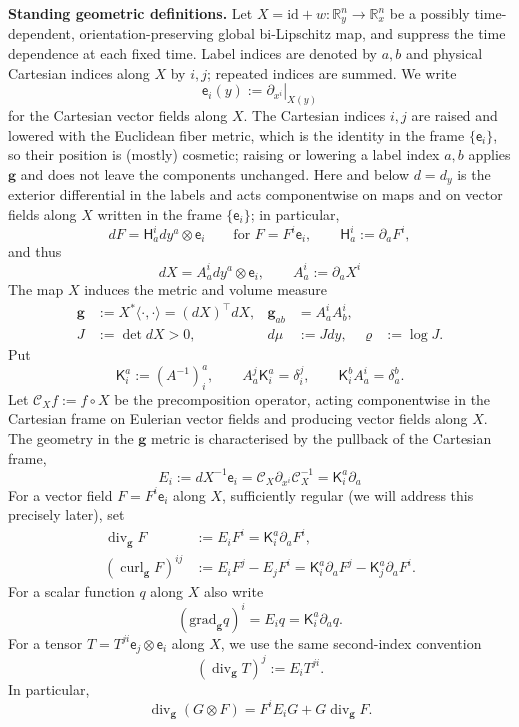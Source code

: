 \documentclass[11pt,reqno]{amsart}
\theoremstyle{plain}
\theoremstyle{definition}
\theoremstyle{remark}
\numberwithin{equation}{section}
\DeclareMathOperator{\Div}{div}
\DeclareMathOperator{\curl}{curl}
\newcommand{\Kmat}{\mathsf K}
\newcommand{\Hess}{\mathsf H}     %
\newcommand{\eframe}{\mathsf e}   %
\newcommand{\gmetric}{\mathbf g}
\newcommand{\Real}{\mathbb R}
\begin{document}
\textbf{Standing geometric definitions.} Let $X=\mathrm{id}+w:\Real_y^n\to\Real_x^n$ be a possibly time-dependent,
orientation-preserving global bi-Lipschitz map, and suppress the time
dependence at each fixed time.  Label indices are denoted by $a,b$ and
physical Cartesian indices along $X$ by $i,j$; repeated indices are summed.  We write
\[
 \eframe_i(y):=\left.\partial_{x^i}\right|_{X(y)}
\]
for the Cartesian vector fields along $X$. The Cartesian indices $i,j$ are raised and lowered with the Euclidean fiber metric,
which is the identity in the frame $\{\eframe_i\}$, so their position is (mostly) cosmetic; raising or lowering a label index $a,b$ applies $\gmetric$ and does not
leave the components unchanged. Here and below $d=d_y$ is the exterior differential in the labels and acts
componentwise on maps and on vector fields along $X$ written in the frame
$\{\eframe_i\}$; in particular,
\[
 dF=\Hess_a^i dy^a\otimes\eframe_i
 \qquad\text{for }F=F^i\eframe_i, \qquad \Hess_a^i:=\partial_aF^i,
\]
and thus
\[
 dX=A_a^i dy^a\otimes\eframe_i, \qquad A_a^i:=\partial_aX^i
\]
The map $X$ induces the metric and volume measure
\begin{align*}
 \gmetric&:=X^*\langle\cdot,\cdot\rangle=(dX)^\top dX,
 &\gmetric_{ab}&=A_a^iA_b^i,\\
 J&:=\det dX>0,
 &d\mu&:=J dy,
 &\varrho&:=\log J.
\end{align*}
Put
\[
 \Kmat^a_i:=(A^{-1})^a_i,
 \qquad
 A_a^j\Kmat^a_i=\delta^j_i,
 \qquad
 \Kmat^b_iA_a^i=\delta^b_a.
\]
Let $\mathcal C_Xf:=f\circ X$ be the precomposition operator, acting componentwise in the Cartesian frame on Eulerian vector fields and producing vector fields along $X$. The geometry in the $\gmetric$ metric is characterised by the pullback of the Cartesian frame,
\begin{equation}\label{eq:component-derivative}
 E_i:=dX^{-1}\eframe_i
 =\mathcal C_X\partial_{x^i}\mathcal C_X^{-1}
 =\Kmat^a_i\partial_a
\end{equation}
For a vector field $F=F^i\eframe_i$ along $X$, sufficiently regular (we will address this precisely later), set
\begin{align}\label{eq:divcurlg}
 \Div_{\gmetric}F
 &:=E_iF^i
   =\Kmat^a_i\partial_aF^i,\\
 (\curl_{\gmetric}F)^{ij}
 &:=E_iF^j-E_jF^i
 =\Kmat^a_i\partial_aF^j-\Kmat^a_j\partial_aF^i.
\end{align}
For a scalar function $q$ along $X$ also write
\begin{equation}\label{eq:metricgradient}
    (\mathrm{grad}_\gmetric q)^i=E_i q=\Kmat^a_i\partial_aq.
\end{equation}
For a tensor $T=T^{ji}\eframe_j\otimes\eframe_i$ along $X$, we use the
same second-index convention
\begin{equation}\label{eq:metric-tensor-divergence}
 (\Div_{\gmetric}T)^j:=E_iT^{ji}.
\end{equation}
In particular,
\begin{equation}\label{eq:metric-transport-divergence}
 \Div_{\gmetric}(G\otimes F)
 =F^iE_iG+G\Div_{\gmetric}F.
\end{equation}
\end{document}
